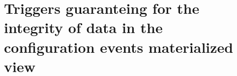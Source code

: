 \section{Triggers guaranteing for the integrity of data in the configuration events materialized view}



